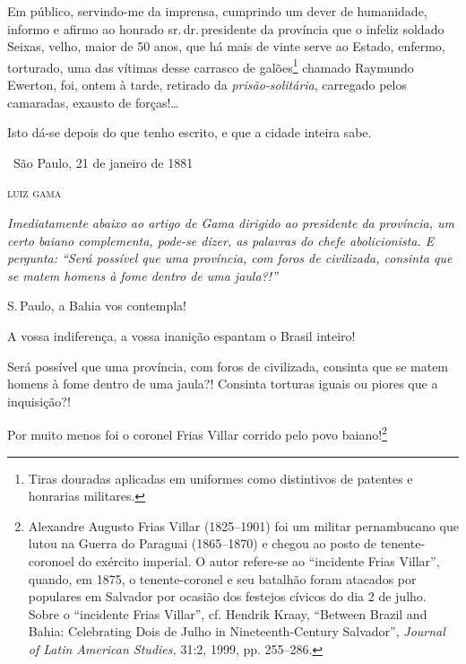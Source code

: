 Em público, servindo-me da imprensa, cumprindo um dever de humanidade,
informo e afirmo ao honrado sr.\,dr.\,presidente da província que o
infeliz soldado Seixas, velho, maior de 50 anos, que há mais de vinte
serve ao Estado, enfermo, torturado, uma das vítimas desse carrasco de
galões\footnote{Tiras douradas aplicadas em uniformes como distintivos
  de patentes e honrarias militares.}
chamado Raymundo Ewerton,
foi, ontem à tarde, retirado da \emph{prisão-solitária}, carregado pelos
camaradas, exausto de forças!\ldots{}

Isto dá-se depois do que tenho escrito, e que a cidade inteira sabe.

\medskip
\hfill\ São Paulo, 21 de janeiro de 1881

\hfill\textsc{luiz gama}


\begin{resumo}
\emph{Imediatamente abaixo ao artigo de Gama dirigido ao presidente da
província, um certo baiano complementa, pode-se dizer, as palavras do
chefe abolicionista. E pergunta: ``Será possível que uma província, com
foros de civilizada, consinta que se matem homens à fome dentro de uma
jaula?!'' }
\end{resumo}

S.\,Paulo, a Bahia vos contempla!

A vossa indiferença, a vossa inanição espantam o Brasil inteiro!

Será possível que uma província, com foros de civilizada, consinta que
se matem homens à fome dentro de uma jaula?! Consinta torturas iguais ou
piores que a inquisição?!

Por muito menos foi o coronel Frias Villar corrido pelo povo
baiano!\footnote{Alexandre Augusto Frias Villar (1825--1901) foi um
  militar pernambucano que lutou na Guerra do Paraguai (1865--1870) e
  chegou ao posto de tenente-coronoel do exército imperial. O autor
  refere-se ao ``incidente Frias Villar'', quando, em 1875, o
  tenente-coronel e seu batalhão foram atacados por populares em
  Salvador por ocasião dos festejos cívicos do dia 2 de julho. Sobre
  o ``incidente Frias Villar'', cf. Hendrik Kraay, ``Between Brazil and
  Bahia: Celebrating Dois de Julho in Nineteenth-Century Salvador'',
  \emph{Journal of Latin American Studies,} 31:2, 1999, pp. 255--286.}

